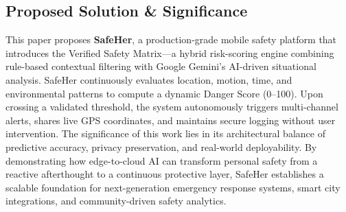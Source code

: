 \subsection{Proposed Solution \& Significance}
This paper proposes \textbf{SafeHer}, a production-grade mobile safety platform that introduces the Verified Safety Matrix---a hybrid risk-scoring engine combining rule-based contextual filtering with Google Gemini's AI-driven situational analysis. SafeHer continuously evaluates location, motion, time, and environmental patterns to compute a dynamic Danger Score (0--100). Upon crossing a validated threshold, the system autonomously triggers multi-channel alerts, shares live GPS coordinates, and maintains secure logging without user intervention. The significance of this work lies in its architectural balance of predictive accuracy, privacy preservation, and real-world deployability. By demonstrating how edge-to-cloud AI can transform personal safety from a reactive afterthought to a continuous protective layer, SafeHer establishes a scalable foundation for next-generation emergency response systems, smart city integrations, and community-driven safety analytics.

